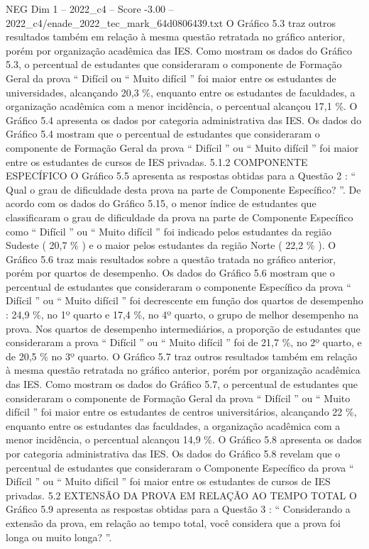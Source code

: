 \begin{textsample}{NEG Dim 1 – 2022\_c4 – Score -3.00 – 2022\_c4/enade\_2022\_tec\_mark\_64d0806439.txt}
O Gráfico 5.3 traz outros resultados também em relação à mesma questão retratada no gráfico anterior, porém por organização acadêmica das IES.
Como mostram os dados do Gráfico 5.3, o percentual de estudantes que consideraram o componente de Formação Geral da prova “ Difícil ou “ Muito difícil ” foi maior entre os estudantes de universidades, alcançando 20,3 \%, enquanto entre os estudantes de faculdades, a organização acadêmica com a menor incidência, o percentual alcançou 17,1 \%.
O Gráfico 5.4 apresenta os dados por categoria administrativa das IES.
Os dados do Gráfico 5.4 mostram que o percentual de estudantes que consideraram o componente de Formação Geral da prova “ Difícil ” ou “ Muito difícil ” foi maior entre os estudantes de cursos de IES privadas. 5.1.2 COMPONENTE ESPECÍFICO O Gráfico 5.5 apresenta as respostas obtidas para a Questão 2 : “ Qual o grau de dificuldade desta prova na parte de Componente Específico? ”.
De acordo com os dados do Gráfico 5.15, o menor índice de estudantes que classificaram o grau de dificuldade da prova na parte de Componente Específico como “ Difícil ” ou “ Muito difícil ” foi indicado pelos estudantes da região Sudeste ( 20,7 \% ) e o maior pelos estudantes da região Norte ( 22,2 \% ).
O Gráfico 5.6 traz mais resultados sobre a questão tratada no gráfico anterior, porém por quartos de desempenho.
Os dados do Gráfico 5.6 mostram que o percentual de estudantes que consideraram o componente Específico da prova “ Difícil ” ou “ Muito difícil ” foi decrescente em função dos quartos de desempenho : 24,9 \%, no 1º quarto e 17,4 \%, no 4º quarto, o grupo de melhor desempenho na prova.
Nos quartos de desempenho intermediários, a proporção de estudantes que consideraram a prova “ Difícil ” ou “ Muito difícil ” foi de 21,7 \%, no 2º quarto, e de 20,5 \% no 3º quarto.
O Gráfico 5.7 traz outros resultados também em relação à mesma questão retratada no gráfico anterior, porém por organização acadêmica das IES.
Como mostram os dados do Gráfico 5.7, o percentual de estudantes que consideraram o componente de Formação Geral da prova “ Difícil ” ou “ Muito difícil ” foi maior entre os estudantes de centros universitários, alcançando 22 \%, enquanto entre os estudantes das faculdades, a organização acadêmica com a menor incidência, o percentual alcançou 14,9 \%.
O Gráfico 5.8 apresenta os dados por categoria administrativa das IES.
Os dados do Gráfico 5.8 revelam que o percentual de estudantes que consideraram o Componente Específico da prova “ Difícil ” ou “ Muito difícil ” foi maior entre os estudantes de cursos de IES privadas. 5.2 EXTENSÃO DA PROVA EM RELAÇÃO AO TEMPO TOTAL O Gráfico 5.9 apresenta as respostas obtidas para a Questão 3 : “ Considerando a extensão da prova, em relação ao tempo total, você considera que a prova foi longa ou muito longa? ”.

\end{textsample}
